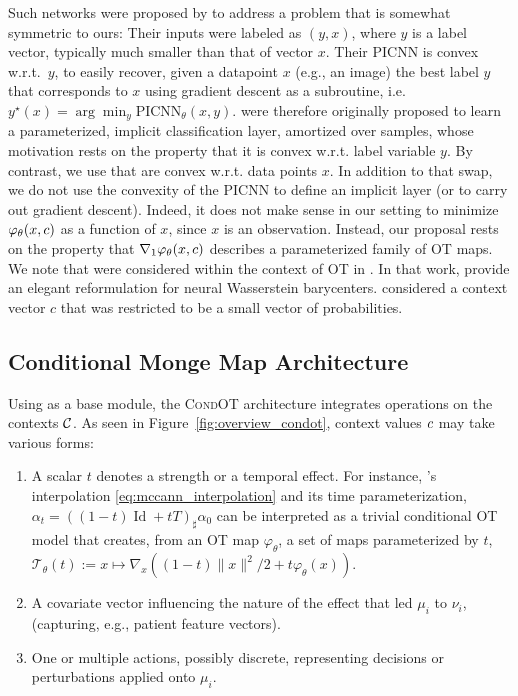 Such networks were proposed by \citet[Eq. 3]{amos2017input} to address a problem that is somewhat symmetric to ours: Their inputs were labeled as $(y, x)$, where $y$ is a label vector, typically much smaller than that of vector $x$. Their \acrshort{PICNN} is convex w.r.t.~$y$, to easily recover, given a datapoint $x$ (e.g., an image) the best label $y$ that corresponds to $x$ using gradient descent as a subroutine, i.e. $y^\star(x) = \arg\min_y \text{PICNN}_\theta(x,y)$.  were therefore originally proposed to learn a parameterized, implicit classification layer, amortized over samples, whose motivation rests on the property that it is convex w.r.t. label variable $y$. By contrast, we use  that are convex w.r.t. data points $x$. In addition to that swap, we do not use the convexity of the \acrshort{PICNN} to define an implicit layer (or to carry out gradient descent). Indeed, it does not make sense in our setting to minimize $\varphi_\theta(x,c)$ as a function of $x$, since $x$ is an observation. Instead, our proposal rests on the property that $\nabla_1 \varphi_\theta(x,c)$ describes a parameterized family of \acrshort{OT} maps. We note that  were considered within the context of \acrshort{OT} in \cite[Appendix B]{fan2021scalable}. In that work,  provide an elegant reformulation for neural Wasserstein barycenters. \citet{fan2021scalable} considered a context vector $c$ that was restricted to be a small vector of probabilities.


\subsection{Conditional Monge Map Architecture}\label{subsec:combin}
Using  as a base module, the \textsc{CondOT} architecture integrates operations on the contexts ${\mathcal{C}}$. As seen in Figure~\ref{fig:overview_condot}, context values $c$ may take various forms:
\begin{enumerate}[noitemsep,leftmargin=.35cm,topsep=0pt,parsep=0pt,partopsep=0pt]
\item A scalar $t$ denotes a strength or a temporal effect. For instance, \citeauthor{mccann1997convexity}'s interpolation \eqref{eq:mccann_interpolation} and its time parameterization, $\alpha_{t}=((1-t) \operatorname{Id}+t T)_{\sharp} \alpha_{0}$ \citep{mccann1997convexity} can be interpreted as a trivial conditional \acrshort{OT} model that creates, from an \acrshort{OT} map $\varphi_\theta$, a set of maps parameterized by $t$, $\mathcal{T}_\theta(t):=x\mapsto\nabla_x \left((1-t)\|x\|^2/2 +t \varphi_\theta(x)\right)$.
\item A covariate vector influencing the nature of the effect that led $\mu_i$ to $\nu_i$, (capturing, e.g., patient feature vectors).
\item One or multiple actions, possibly discrete, representing decisions or perturbations applied onto $\mu_i$. \\
\end{enumerate}

